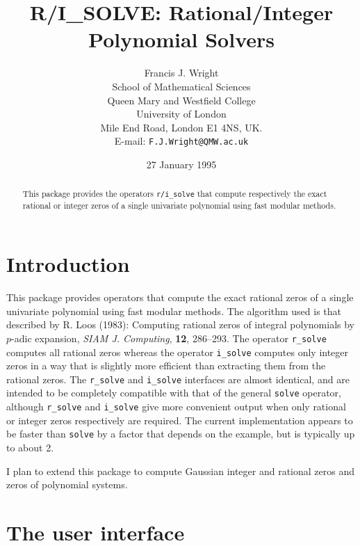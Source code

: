 
\title{R/I\_SOLVE: Rational/Integer Polynomial Solvers}

\author{Francis J. Wright \\
School of Mathematical Sciences \\
Queen Mary and Westfield College \\
University of London \\
Mile End Road, London E1 4NS, UK. \\
E-mail: {\tt F.J.Wright@QMW.ac.uk}}

\date{27 January 1995}


\maketitle

\begin{abstract}
  This package provides the operators \verb|r/i_solve| that compute
  respectively the exact rational or integer zeros of a single
  univariate polynomial using fast modular methods.
\end{abstract}


\section{Introduction}

This package provides operators that compute the exact rational zeros
of a single univariate polynomial using fast modular methods.  The
algorithm used is that described by R. Loos (1983): Computing rational
zeros of integral polynomials by $p$-adic expansion, {\it SIAM J.
Computing}, {\bf 12}, 286--293.  The operator \verb|r_solve| computes
all rational zeros whereas the operator \verb|i_solve| computes only
integer zeros in a way that is slightly more efficient than extracting
them from the rational zeros.  The \verb|r_solve| and \verb|i_solve|
interfaces are almost identical, and are intended to be completely
compatible with that of the general \verb|solve| operator, although
\verb|r_solve| and \verb|i_solve| give more convenient output when
only rational or integer zeros respectively are required.  The current
implementation appears to be faster than \verb|solve| by a factor that
depends on the example, but is typically up to about 2.

I plan to extend this package to compute Gaussian integer and rational
zeros and zeros of polynomial systems.


\section{The user interface}

